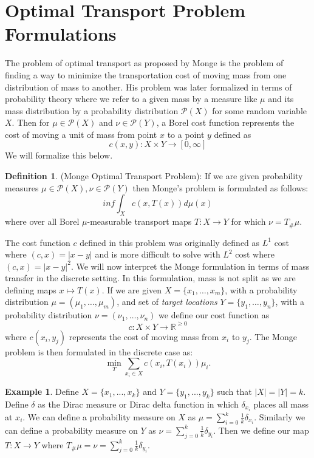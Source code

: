 \documentclass{Dissertate}
\theoremstyle{definition}
\theoremstyle{definition} %
\theoremstyle{definition}
\newtheorem{definition}[theorem]{Definition}
\newtheorem{example}[theorem]{Example}
\begin{document}
\section*{Optimal Transport Problem Formulations}
The problem of optimal transport as proposed by Monge is the problem of finding a way to minimize the transportation cost of moving mass from one distribution of mass to another. His problem was later formalized in terms of probability theory where we refer to a given mass by a measure like $\mu$ and its mass distribution by a probability distribution $\mathcal{P}(X)$ for some random variable $X$. Then for $\mu \in \mathcal{P}(X)$ and $\nu \in \mathcal{P}(Y)$, a Borel cost function represents the cost of moving a unit of mass from point $x$ to a point $y$ defined as
$$
c(x,y): X \times Y \rightarrow [0, \infty]
$$
We will formalize this below. 
\begin{definition} \cite{VillaniCedric2009Ot:o} (Monge Optimal Transport Problem):
If we are given probability measures $\mu \in \mathcal{P}(X), \nu \in \mathcal{P}(Y)$ then Monge's problem is formulated as follows: 
$$
inf \int_X c(x,T(x))d\mu(x)
$$
where 
over all Borel $\mu$-measurable transport maps $T: X \rightarrow Y$ for which $\nu = T_{\#}\mu$.
\end{definition}
The cost function $c$ defined in this problem was originally defined as $L^1$ cost where $(c,x) = |x-y|$ and is more difficult to solve with $L^2$ cost where $(c,x) = |x-y|^2$. 
We will now interpret the Monge formulation in terms of mass transfer in the discrete setting. In this formulation, mass is not split as we are defining maps $x \mapsto  T(x)$. If we are given $X = \{x_1, \dots, x_m\}$, with a probability distribution $\mu = (\mu_1, \dots, \mu_m)$, and set of \textit{target locations} $Y = \{y_1, \dots, y_n\}$, with a probability distribution $\nu = (\nu_1, \dots, \nu_n)$ we define our cost function as
$$
c: X \times Y \to \mathbb{R}^{\geq 0} 
$$
where $ c(x_i, y_j) $ represents the cost of moving mass from $ x_i $ to $ y_j $. The Monge problem is then formulated in the discrete case as:
\[
\min_{T} \sum_{x_i \in X} c(x_i, T(x_i)) \mu_i.
\]
\begin{example}
Define $X = \{x_1,...,x_k \}$ and $Y = \{y_1,...,y_k\}$ such that $|X|=|Y|=k$. Define $\delta$ as the Dirac measure or Dirac delta function in which $\delta_{x_i}$ places all mass at $x_i$. We can define a probability measure on $X$ as $\mu = \sum_{i = 0}^k \frac{1}{k} \delta_{x_i}$. Similarly we can define a probability measure on $Y$ as $\nu = \sum_{j = 0}^k \frac{1}{k} \delta_{y_i}$. Then we define our map $T: X \rightarrow Y$ where $T_{\#}\mu = \nu = \sum_{j = 0}^k \frac{1}{k} \delta_{y_i}$.
\end{example}
\end{document}
